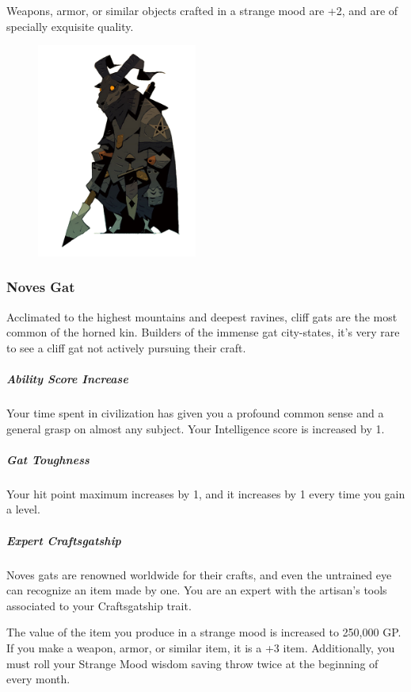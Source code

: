 \begin{linenumbers}
Weapons, armor, or similar objects crafted in a strange mood are +2, and are of specially exquisite quality.

\begin{figure}[!b]
    \centering
    \includegraphics[width=0.47\textwidth]{02kins/img/11gat_knight.png}
\end{figure}

\newpage

\subsubsection{Noves Gat}
Acclimated to the highest mountains and deepest ravines, cliff gats are the most common of the horned kin.
Builders of the immense gat city-states, it's very rare to see a cliff gat not actively pursuing their craft.

\subparagraph{Ability Score Increase} Your time spent in civilization has given you a profound common sense and a general grasp on almost any subject.
Your Intelligence score is increased by 1.

\subparagraph{Gat Toughness} Your hit point maximum increases by 1, and it increases by 1 every time you gain a level.

\subparagraph{Expert Craftsgatship} Noves gats are renowned worldwide for their crafts, and even the untrained eye can recognize an item made by one.
You are an expert with the artisan's tools associated to your Craftsgatship trait.

The value of the item you produce in a strange mood is increased to 250,000 GP.
If you make a weapon, armor, or similar item, it is a +3 item.
Additionally, you must roll your Strange Mood wisdom saving throw twice at the beginning of every month.


\end{linenumbers}
